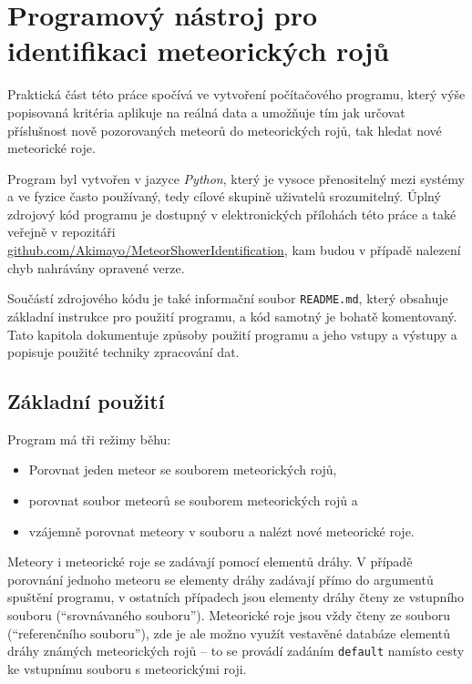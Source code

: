 \chapter{Programový nástroj pro identifikaci meteorických rojů\label{cpt:practical}}%
Praktická část této práce spočívá ve vytvoření počítačového programu, který výše popisovaná kritéria aplikuje na reálná data a umožňuje tím jak určovat příslušnost nově pozorovaných meteorů do meteorických rojů, tak hledat nové meteorické roje.

Program byl vytvořen v jazyce \textit{Python}, který je vysoce přenositelný mezi systémy a ve fyzice často používaný, tedy cílové skupině uživatelů srozumitelný. Úplný zdrojový kód programu je dostupný v elektronických přílohách této práce a také veřejně v repozitáři \\\href{https://github.com/Akimayo/MeteorShowerIdentification}{github.com/Akimayo/MeteorShowerIdentification}, kam budou v případě nalezení chyb nahrávány opravené verze.

Součástí zdrojového kódu je také informační soubor \texttt{README.md}, který obsahuje základní instrukce pro použití programu, a kód samotný je bohatě komentovaný. Tato kapitola dokumentuje způsoby použití programu a jeho vstupy a výstupy a popisuje použité techniky zpracování dat.

\section{Základní použití}%
Program má tři režimy běhu:
\begin{itemize}
    \item Porovnat jeden meteor se souborem meteorických rojů,
    \item porovnat soubor meteorů se souborem meteorických rojů a
    \item vzájemně porovnat meteory v souboru a nalézt nové meteorické roje.
\end{itemize}

Meteory i meteorické roje se zadávají pomocí elementů dráhy. V případě porovnání jednoho meteoru se elementy dráhy zadávají přímo do argumentů spuštění programu, v ostatních případech jsou elementy dráhy čteny ze vstupního souboru ("`srovnávaného souboru"'). Meteorické roje jsou vždy čteny ze souboru ("`referenčního souboru"'), zde je ale možno využít vestavěné databáze elementů dráhy známých meteorických rojů -- to se provádí zadáním \texttt{default} namísto cesty ke vstupnímu souboru s meteorickými roji.

